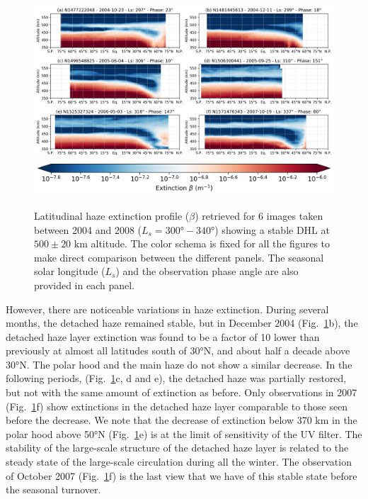\begin{figure}[!ht]
    \centering
    \includegraphics[width=\textwidth]{Fig/Lat_beta-2004_2008.png}
    \includegraphics[width=.5\textwidth]{Fig/Extinction_colorbar.png}\vspace{-.3cm}
    \caption{Latitudinal haze extinction profile ($\beta$) retrieved for 6 images taken between 2004 and 2008
    ($L_s=\ang{300}-\ang{340}$) showing a stable DHL at $500 \pm 20$ km altitude.
    The color schema is fixed for all the figures to make direct comparison
    between the different panels. The seasonal solar longitude ($L_s$) and the observation phase angle are
    also provided in each panel.}
    \label{fig:dhl_2004_2008}
\end{figure}

However, there are noticeable variations in haze extinction. During several months, the
detached haze remained stable, but in December 2004 (Fig.~\ref{fig:dhl_2004_2008}b),
the detached haze layer extinction was found to be a factor of 10 lower than previously at almost all latitudes south
of \ang{30}N, and about half a decade above \ang{30}N. The polar hood and the main haze do not show a similar decrease.
In the following periods, (Fig.~\ref{fig:dhl_2004_2008}c, d and e),
the detached haze was partially restored, but not with the same amount of extinction as before. Only observations in
2007 (Fig.~\ref{fig:dhl_2004_2008}f) show extinctions in the detached haze layer comparable to those seen before
the decrease. We note that the decrease of extinction below 370 km in the polar hood above \ang{50}N
(Fig.~\ref{fig:dhl_2004_2008}e) is at the limit of sensitivity of the UV filter. The stability of the large-scale
structure of the detached haze layer is related to the steady state of the large-scale circulation during all the winter.
The observation of October 2007 (Fig.~\ref{fig:dhl_2004_2008}f) is the last view that we have of this stable state
before the seasonal turnover.

